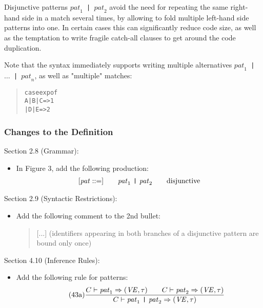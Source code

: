 \documentclass[twoside,titlepage]{article}
\begin{document}
\begin{appendix}
Disjunctive patterns {\tt $\mathit{pat}_1$ | $\mathit{pat}_2$} avoid the need for repeating the same right-hand side in a match several times, by allowing to fold multiple left-hand side patterns into one. In certain cases this can significantly reduce code size, as well as the temptation to write fragile catch-all clauses to get around the code duplication.

Note that the syntax immediately supports writing multiple alternatives {\tt $\mathit{pat}_1$ | $\dots$ | $\mathit{pat}_n$}, as well as "multiple" matches:
\begin{quote}
\begin{alltt}
case exp of
    A | B | C => 1
  | D | E => 2
\end{alltt}
\end{quote}

\subsubsection*{Changes to the Definition}

Section 2.8 (Grammar):
\begin{itemize}
\item In Figure 3, add the following production:
  $$
  \begin{array}{l@{\qquad}l@{\qquad}l}
   [\mathit{pat} ::=] & \mathit{pat}_1~\mbox{\tt|}~\mathit{pat}_2 & \textrm{disjunctive}
  \end{array}
  $$
\end{itemize}

Section 2.9 (Syntactic Restrictions):
\begin{itemize}
\item Add the following comment to the 2nd bullet:
  \begin{quote}
  [...] (identifiers appearing in both branches of a disjunctive pattern are bound only once) 
  \end{quote}
\end{itemize}

Section 4.10 (Inference Rules):
\begin{itemize}
\item Add the following rule for patterns:
  \begin{equation}
  \tag{43a}
  \frac{
  C \vdash \mathit{pat}_1 \Rightarrow (\mathit{VE},\tau)
  \qquad
  C \vdash \mathit{pat}_2 \Rightarrow (\mathit{VE},\tau)
  }{
  C \vdash \mathit{pat}_1~\mbox{\tt|}~\mathit{pat}_2 \Rightarrow (\mathit{VE},\tau)
  }
  \end{equation}
\end{itemize}


\end{appendix}
\end{document}

